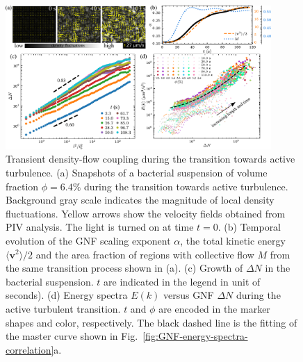 \documentclass[twocolumn,aps,prx,amsmath,amssymb,longbibliography]{revtex4-2}
\begin{document}
\begin{figure}[t]
\begin{center}
\includegraphics[width=0.9\textwidth]{figures/GNF-energy-spectra-correlation-transient/v7.pdf}
\caption[The correlation between GNF and kinetic energy and kinetic energy spectra at transient state]
{
Transient density-flow coupling during the transition towards active turbulence.
(a) Snapshots of a bacterial suspension of volume fraction $\phi=6.4\%$ during the transition towards active turbulence. Background gray scale indicates the magnitude of local density fluctuations. Yellow arrows show the velocity fields obtained from PIV analysis. The light is turned on at time $t = 0$.
(b) Temporal evolution of the GNF scaling exponent $\alpha$, the total kinetic energy $\langle \bm{v}^2 \rangle/2$ and the area fraction of regions with collective flow $M$ from the same transition process shown in (a).
(c) Growth of $\Delta N$ in the bacterial suspension. $t$ are indicated in the legend in unit of seconds).
(d) Energy spectra $E(k)$ versus GNF $\Delta N$ during the active turbulent transition. $t$ and $\phi$ are encoded in the marker shapes and color, respectively. The black dashed line is the fitting of the master curve shown in Fig.~\ref{fig:GNF-energy-spectra-correlation}a.
}
\label{fig:GNF-energy-spectra-correlation-transient}
\end{center}
\end{figure}
\end{document}
